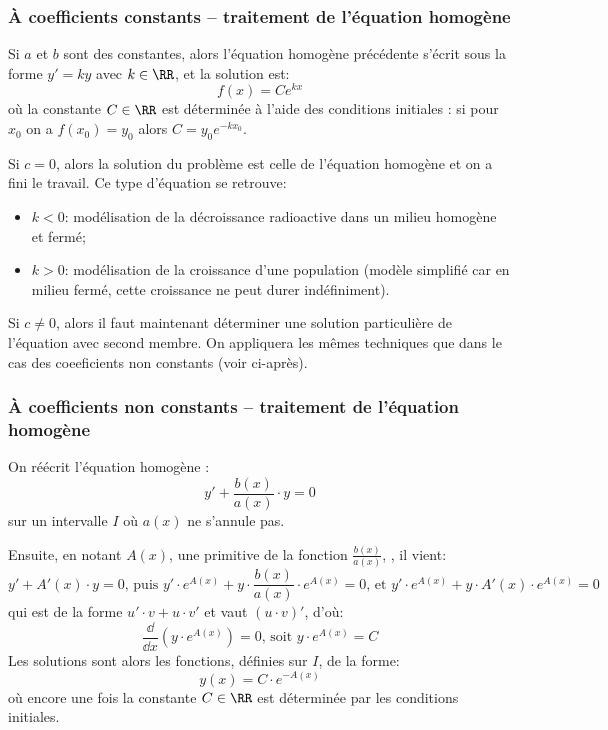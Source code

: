 \medskip
\subsubsection{À coefficients constants -- traitement de l'équation homogène}

Si $a$ et $b$ sont des constantes, alors l'équation homogène précédente s'écrit 
sous la forme $y' = ky$ avec $k\in\RR$, et la solution est:
\begin{equation}
    f(x) = Ce^{kx}
\end{equation}
où la constante $C\in\RR$ est déterminée à l'aide des conditions initiales : 
si pour $x_0$ on a $f(x_0) = y_0$ alors $C = y_0e^{-kx_0}$.

\medskip
Si $c=0$, alors la solution du problème est celle de l'équation homogène et on a fini
le travail. Ce type d'équation se retrouve:
\begin{itemize}
    \item $k<0$: modélisation de la décroissance radioactive dans un milieu homogène et fermé;
    \item $k>0$: modélisation de la croissance d'une population (modèle simplifié car en milieu
	fermé, cette croissance ne peut durer indéfiniment).
\end{itemize}

\medskip
Si $c\ne0$, alors il faut maintenant déterminer une solution particulière de l'équation avec
second membre. On appliquera les mêmes techniques que dans le cas des coeeficients non 
constants (voir ci-après).


\medskip
\subsubsection{À coefficients non constants -- traitement de l'équation homogène}

On réécrit l'équation homogène :
\begin{equation}
    y' + \frac{b(x)}{a(x)} \cdot y = 0
\end{equation}
sur un intervalle $I$ où $a(x)$ ne s'annule pas.

Ensuite, en notant $A(x)$, une primitive de la fonction $\frac{b(x)}{a(x)}$, , il vient:
\begin{equation}
    y' + A'(x) \cdot y =0 
\text{, puis }
    y' \cdot e^{A(x)} + y \cdot \frac{b(x)}{a(x)} \cdot e^{A(x)} =0
\text{, et }
    y' \cdot e^{A(x)} + y \cdot A'(x) \cdot e^{A(x)}=0
\end{equation}
qui est de la forme $u' \cdot v + u \cdot v'$ et vaut $ (u \cdot v)'$, d'où:
\begin{equation}
    \frac{\dd}{\dd x}(y \cdot e^{A(x)})=0
\text{, soit }
    y \cdot e^{A(x)} = C
\end{equation}
Les solutions sont alors les fonctions, définies sur $I$, de la forme:
\begin{equation}
    y(x) = C \cdot e^{-A(x)}
\end{equation}
où encore une fois la constante $C\in\RR$ est déterminée par les conditions initiales.

